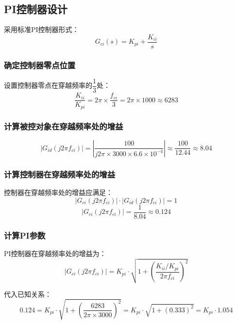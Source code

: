 \documentclass[11pt,a4paper]{article}
\begin{document}
\subsection{PI控制器设计}
采用标准PI控制器形式：
\begin{equation}
G_{ci}(s) = K_{pi} + \frac{K_{ii}}{s}
\end{equation}

\subsubsection{确定控制器零点位置}
设置控制器零点在穿越频率的$\dfrac{1}{3}$处：
\begin{equation}
\frac{K_{ii}}{K_{pi}} = 2\pi \times \frac{f_{ci}}{3} = 2\pi \times 1000 \approx 6283
\end{equation}

\subsubsection{计算被控对象在穿越频率处的增益}
\begin{equation}
|G_{id}(j2\pi f_{ci})| = \left|\frac{100}{j2\pi \times 3000 \times 6.6\times10^{-4}}\right| \approx \frac{100}{12.44} \approx 8.04
\end{equation}

\subsubsection{计算控制器在穿越频率处的增益}
控制器在穿越频率处的增益应满足：
\begin{equation}
|G_{ci}(j2\pi f_{ci})| \cdot |G_{id}(j2\pi f_{ci})| = 1
\end{equation}
\begin{equation}
|G_{ci}(j2\pi f_{ci})| = \frac{1}{8.04} \approx 0.124
\end{equation}

\subsubsection{计算PI参数}
PI控制器在穿越频率处的增益为：
\begin{equation}
|G_{ci}(j2\pi f_{ci})| = K_{pi} \cdot \sqrt{1 + \left(\frac{K_{ii}/K_{pi}}{2\pi f_{ci}}\right)^2}
\end{equation}

代入已知关系：
\begin{equation}
0.124 = K_{pi} \cdot \sqrt{1 + \left(\frac{6283}{2\pi \times 3000}\right)^2} = K_{pi} \cdot \sqrt{1 + (0.333)^2} = K_{pi} \cdot 1.054
\end{equation}
\end{document}
